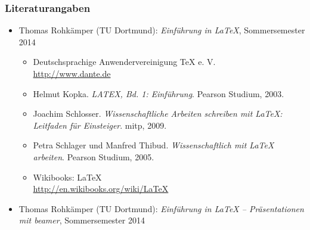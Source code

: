 \documentclass[t]{beamer}
\begin{document}
\begin{frame}
	\frametitle{Literaturangaben}
	\begin{itemize}
		\item Thomas Rohkämper (TU Dortmund): \textit{Einführung in \LaTeX}, Sommersemester 2014
		\begin{itemize}
			\item Deutschsprachige Anwendervereinigung TeX e. V.\\
			\href{http://www.dante.de}{http://www.dante.de}
			\item Helmut Kopka. \textit{LATEX, Bd. 1: Einführung}. Pearson Studium, 2003.
			\item Joachim Schlosser. \textit{Wissenschaftliche Arbeiten schreiben mit \LaTeX: Leitfaden für Einsteiger}. mitp, 2009.
            \item Petra Schlager und Manfred Thibud. \textit{Wissenschaftlich mit \LaTeX{} arbeiten}. Pearson Studium, 2005.
			\item Wikibooks: LaTeX\\
			\href{http://en.wikibooks.org/wiki/LaTeX}{http://en.wikibooks.org/wiki/LaTeX}
		\end{itemize}
    \item Thomas Rohkämper (TU Dortmund): \textit{Einführung in \LaTeX{} -- Präsentationen mit \textit{beamer}}, Sommersemester 2014
	\end{itemize}
\end{frame}
\end{document}
